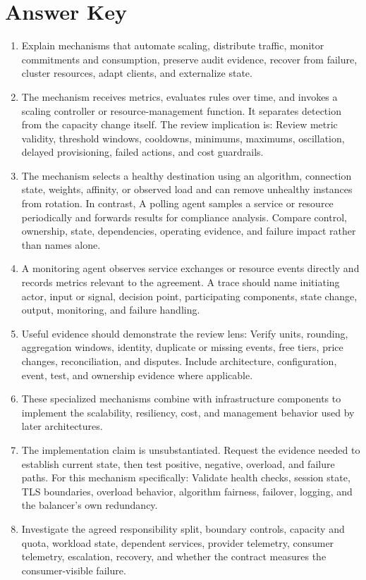 \documentclass[11pt]{article}
\begin{document}
\section{Answer Key}
\begin{enumerate}
\item Explain mechanisms that automate scaling, distribute traffic, monitor commitments and consumption, preserve audit evidence, recover from failure, cluster resources, adapt clients, and externalize state.
\item The mechanism receives metrics, evaluates rules over time, and invokes a scaling controller or resource-management function. It separates detection from the capacity change itself. The review implication is: Review metric validity, threshold windows, cooldowns, minimums, maximums, oscillation, delayed provisioning, failed actions, and cost guardrails.
\item The mechanism selects a healthy destination using an algorithm, connection state, weights, affinity, or observed load and can remove unhealthy instances from rotation. In contrast, A polling agent samples a service or resource periodically and forwards results for compliance analysis. Compare control, ownership, state, dependencies, operating evidence, and failure impact rather than names alone.
\item A monitoring agent observes service exchanges or resource events directly and records metrics relevant to the agreement. A trace should name initiating actor, input or signal, decision point, participating components, state change, output, monitoring, and failure handling.
\item Useful evidence should demonstrate the review lens: Verify units, rounding, aggregation windows, identity, duplicate or missing events, free tiers, price changes, reconciliation, and disputes. Include architecture, configuration, event, test, and ownership evidence where applicable.
\item These specialized mechanisms combine with infrastructure components to implement the scalability, resiliency, cost, and management behavior used by later architectures.
\item The implementation claim is unsubstantiated. Request the evidence needed to establish current state, then test positive, negative, overload, and failure paths. For this mechanism specifically: Validate health checks, session state, TLS boundaries, overload behavior, algorithm fairness, failover, logging, and the balancer's own redundancy.
\item Investigate the agreed responsibility split, boundary controls, capacity and quota, workload state, dependent services, provider telemetry, consumer telemetry, escalation, recovery, and whether the contract measures the consumer-visible failure.

\end{enumerate}
\end{document}
